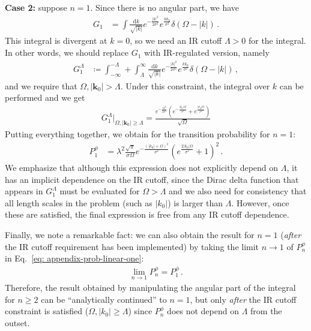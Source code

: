 \documentclass[11pt,prd,onecolumn,superscriptaddress,nofootinbib,floatfix,amsmath,amssymb]{revtex4-2}
\newcommand{\bk}{{\bm{k}}}
\newcommand{\dd}{\textrm{d}}
\begin{document}
	\textbf{Case 2:} suppose $n=1$. Since there is no angular part, we have
	\begin{align}
	    G_1 &=  \int\frac{\dd k }{\sqrt{|k|}}e^{-\frac{|k|^2}{2\sigma^2}}e^{\frac{kk_0}{\sigma^2}}\delta(\Omega-|k|)\,.
	\end{align}
	This integral is divergent at $k=0$, so we need an IR cutoff $\Lambda>0$ for the integral. In other words, we should replace $G_1$ with IR-regulated version, namely 
	\begin{align}
	    G_1^\Lambda &\coloneqq  \int_{-\infty}^{-\Lambda}+\int_\Lambda^\infty\frac{\dd k }{\sqrt{|k|}}e^{-\frac{|k|^2}{2\sigma^2}}e^{\frac{kk_0}{\sigma^2}}\delta(\Omega-|k|)\,,
	\end{align}
	and we require that $\Omega,|\bk_0|>\Lambda$. Under this constraint, the integral over $k$ can be performed and we get
	\begin{align}
	    G^\Lambda_1\Bigr|_{\Omega,|\bk_0|\geq \Lambda} = \frac{e^{-\frac{\Omega ^2}{2 \sigma ^2}} \left(e^{-\frac{|k_0| \Omega }{\sigma ^2}}+e^{\frac{|k_0| \Omega }{\sigma ^2}}\right)}{\sqrt{\Omega }}
	\end{align}
	Putting everything together, we obtain for the transition probability for $n=1$:
    \begin{align}
        P^\phi_{1} &= 
	    \lambda^2\frac{\sqrt{\pi }}{\sigma  \Omega } e^{-\frac{(|k_0|+\Omega )^2}{\sigma ^2}} \left(e^{\frac{2 |k_0| \Omega }{\sigma ^2}}+1\right)^2\,.
    \end{align}
    We emphasize that although this expression does not explicitly depend on $\Lambda$, it has an implicit dependence on the IR cutoff, since the Dirac delta function that appears in $G_1^\Lambda$ must be evaluated for $\Omega >\Lambda$ and we also need for consistency that all length scales in the problem (such as $|k_0|$) is larger than $\Lambda$. However, once these are satisfied, the final expression is free from any IR cutoff dependence.
    
    {Finally, we note a remarkable fact: we can also obtain the result for $n=1$ (\textit{after} the IR cutoff requirement has been implemented) by taking the limit $n\to 1$ of $P^\phi_n$ in Eq.~\eqref{eq: appendix-prob-linear-one}:
	\begin{align}
	    \lim_{n\to 1} P^\phi_n = P^\phi_{1}\,.
	\end{align}
	Therefore, the result obtained by manipulating the angular part of the integral for $n\geq 2$ can be ``analytically continued'' to $n=1$, but only \textit{after} the IR cutoff constraint is satisfied ($\Omega,|k_0|\geq \Lambda$) since $P_n^\phi$ does not depend on $\Lambda$ from the outset.}
	
\end{document}
